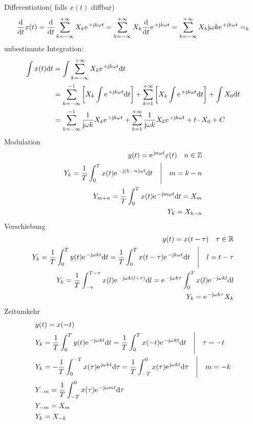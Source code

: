 \documentclass[11pt,a4paper,DIV=12]{scrartcl}
\begin{document}
Differentiation( falls $x(t)$ diffbar)
\begin{align}
	\frac{\mathrm{d}}{\mathrm{d}t}x(t)=\frac{\mathrm{d}}{\mathrm{d}t}\sum_{k=-\infty}^{+\infty}X_k\e^{+\im k \omega t}=\sum_{k=-\infty}^{+\infty}X_k\frac{\mathrm{d}}{\mathrm{d}t}\e^{+\im k \omega t}=\sum_{k=-\infty}^{+\infty}X_k\im\omega k\e^{+\im k \omega t}=_k
\end{align}
unbestimmte Integration:
\begin{align}
	\int x(t)\mathrm{d}t&=\int\sum_{k=-\infty}^{+\infty}X_k\e^{+\im k \omega t}\mathrm{d}t \\
	&= \sum_{k=-\infty}^{-1}\bigg [X_k\int\e^{+\im k \omega t}\mathrm{d}t\bigg ]+\sum_{k=1}^{+\infty}\bigg [X_k\int\e^{+\im k \omega t}\mathrm{d}t\bigg ]+\int X_0\mathrm{d}t\\
	&=\sum_{k=-\infty}^{-1}\frac{1}{\im\omega k}X_k\e^{+\im k \omega t}+\sum_{k=1}^{+\infty}\frac{1}{\im\omega k}X_k\e^{+\im k \omega t}+t\cdot X_0+C
\end{align}
Modulation
\begin{align}
	y(t)=\e^{\im n\omega t}x(t) \quad n\in\mathbb{Z}\\
	Y_k=\frac{1}{T}\int_0^Tx(t)\e^{-\im(k-n)\omega t}\mathrm{d}t\quad\Bigg | \quad m = k-n \\
	Y_{m+n}=\frac{1}{T}\int_0^Tx(t)\e^{-\im  m \omega t}\mathrm{d}t=X_m \\
	Y_{k}=X_{k-n}
\end{align}
Verschiebung
\begin{align}
	y(t)=x(t-\tau)\quad\tau\in\mathbb{R}\\
	Y_k=\frac{1}{T}\int_0^{T}y(t)\e^{-\im\omega k t}\mathrm{d}t=\frac{1}{T}\int_0^{T}x(t-\tau)\e^{-\im k \omega t}\mathrm{d}t \quad \Bigg | \quad l = t-\tau\\
	Y_k=\frac{1}{T}\int_{-\tau}^{T-\tau}x(l)\e^{-\im\omega k (l+\tau)}\mathrm{d}l=\e^{-\im \omega k \tau}\int_{0}^{T}x(l)\e^{-\im\omega k l}\mathrm{d}l \\
	Y_k=\e^{-\im\omega k \tau}X_k
\end{align}
Zeitumkehr
\begin{align}
	&y(t)=x(-t) \\
	&Y_k=\frac{1}{T}\int_0^{T}y(t)\e^{-\im\omega k t}\mathrm{d}t=\frac{1}{T}\int_0^{T}x(-t)\e^{-\im\omega k t}\mathrm{d}t\quad\Bigg | \quad \tau = -t \\
	&Y_k=-\frac{1}{T}\int_0^{-T}x(\tau)\e^{\im\omega k t}\mathrm{d}\tau=\frac{1}{T}\int_{-T}^{0}x(\tau)\e^{\im\omega k t}\mathrm{d}\tau \quad \Bigg |\quad m = -k \\
	&Y_{-m}=\frac{1}{T}\int_{-T}^{0}x(\tau)\e^{-\im\omega m t}\mathrm{d}\tau \\
	&Y_{-m}=X_m \\
	&Y_{k}=X_{-k}
\end{align}
\end{document}
